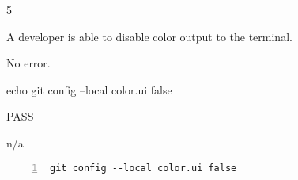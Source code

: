 \begin{description}[align=right,leftmargin=3.2cm,labelindent=3.0cm]
\item[Step:] 5
\item[Confirm:] A developer is able to disable color output to the terminal.
\item[Expectation:] No error.
\item[Command:] echo git  config --local color.ui false
\item[Test Result:] PASS
\item[Evidence:] n/a
\end{description}
\begin{lstlisting}[numbers=left]
git config --local color.ui false

\end{lstlisting}
